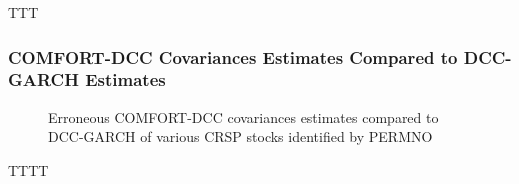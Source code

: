 \documentclass[11pt,a4paper]{article}
\begin{document}
TTT

\newpage
\subsubsection{COMFORT-DCC Covariances Estimates Compared to DCC-GARCH Estimates}

\begin{figure}[H] \label{figure:vw_cum_ret_high-low}
	\hspace{-5mm}
	\caption{Erroneous COMFORT-DCC covariances estimates compared to DCC-GARCH of various CRSP stocks identified by PERMNO}
\end{figure}

TTTT
\end{document}
